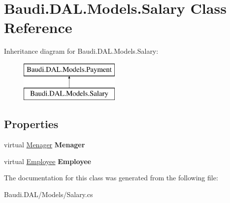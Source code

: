 \hypertarget{class_baudi_1_1_d_a_l_1_1_models_1_1_salary}{}\section{Baudi.\+D\+A\+L.\+Models.\+Salary Class Reference}
\label{class_baudi_1_1_d_a_l_1_1_models_1_1_salary}
Inheritance diagram for Baudi.\+D\+A\+L.\+Models.\+Salary\+:\begin{figure}[H]
\begin{center}
\leavevmode
\includegraphics[height=2.000000cm]{class_baudi_1_1_d_a_l_1_1_models_1_1_salary}
\end{center}
\end{figure}
\subsection*{Properties}
\begin{DoxyCompactItemize}
\item 
\hypertarget{class_baudi_1_1_d_a_l_1_1_models_1_1_salary_a018e7bc66fcb66656a0255f1ff91e110}{}virtual \hyperlink{class_baudi_1_1_d_a_l_1_1_models_1_1_menager}{Menager} {\bfseries Menager}\label{class_baudi_1_1_d_a_l_1_1_models_1_1_salary_a018e7bc66fcb66656a0255f1ff91e110}

\item 
\hypertarget{class_baudi_1_1_d_a_l_1_1_models_1_1_salary_abb56f282c44e0211d98d7eb76b5332d9}{}virtual \hyperlink{class_baudi_1_1_d_a_l_1_1_models_1_1_employee}{Employee} {\bfseries Employee}\label{class_baudi_1_1_d_a_l_1_1_models_1_1_salary_abb56f282c44e0211d98d7eb76b5332d9}

\end{DoxyCompactItemize}


The documentation for this class was generated from the following file\+:\begin{DoxyCompactItemize}
\item 
Baudi.\+D\+A\+L/\+Models/Salary.\+cs\end{DoxyCompactItemize}
